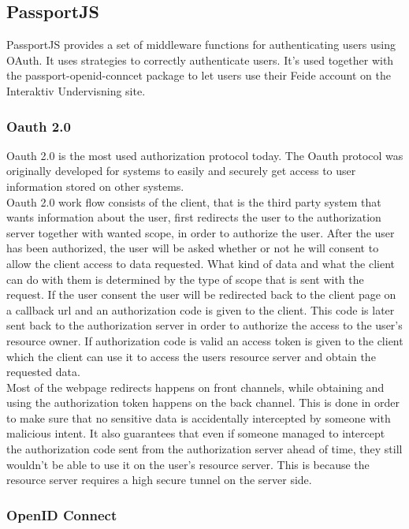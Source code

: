 \subsection{PassportJS}
PassportJS provides a set of middleware functions for authenticating users using OAuth. It uses strategies to correctly authenticate users. It's used together with the passport-openid-conncet package to let users use their Feide account on the Interaktiv Undervisning site.
\subsubsection{Oauth 2.0}
Oauth 2.0 is the most used authorization protocol today. The Oauth protocol was originally developed for systems to easily and securely get access to user information stored on other systems.\\
Oauth 2.0 work flow consists of the client, that is the third party system that wants information about the user, first redirects the user to the authorization server together with wanted scope, in order to authorize the user. After the user has been authorized, the user will be asked whether or not he will consent to allow the client access to data requested. What kind of data and what the client can do with them is determined by the type of scope that is sent with the request. If the user consent the user will be redirected back to the client page on a callback url and an authorization code is given to the client. This code is later sent back to the authorization server in order to authorize the access to the user's resource owner. If authorization code is valid an access token is given to the client which the client can use it to access the users resource server and obtain the requested data.\\
Most of the webpage redirects happens on front channels, while obtaining and using the authorization token happens on the back channel. This is done in order to make sure that no sensitive data is accidentally intercepted by someone with malicious intent. It also guarantees that even if someone managed to intercept the authorization code sent from the authorization server ahead of time, they still wouldn't be able to use it on the user's resource server. This is because the resource server requires a high secure tunnel on the server side.
\subsubsection{OpenID Connect}
